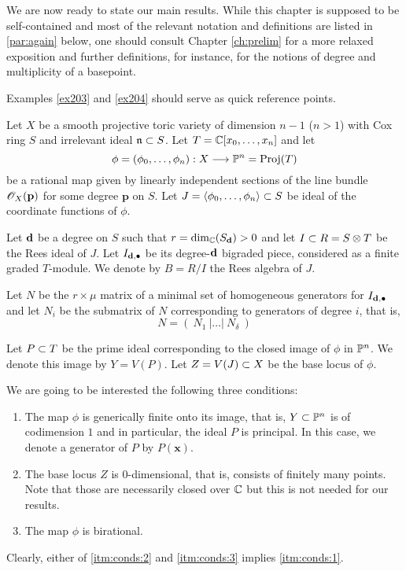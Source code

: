 \documentclass[fleqn,reqno]{amsart}
\newcounter{chapter}
\numberwithin{first}{chapter}
\begin{document}



\begin{paragraf*}
We are now ready to state our main results.
While this chapter is supposed to be self-contained and most of the relevant notation
and definitions are listed in \eqref{par:again} below,
one should consult Chapter \ref{ch:prelim} for a more relaxed exposition
and further definitions, for instance,
for the notions of degree and multiplicity of a basepoint.

Examples \ref{ex203} and \ref{ex204} should serve as quick reference points.
\end{paragraf*}

\begin{definition}
\label{par:again}
Let $X$ be a smooth projective toric variety of dimension $n-1$ ($n>1$)
with Cox ring $S$ and irrelevant ideal $\mathfrak{n}\subset S$.
Let $T=\mathbb{C}[x_0,\ldots,x_n]$ and let
\[
\phi=(\phi_0,\ldots,\phi_n):X\longrightarrow\mathbb{P}^n=\operatorname{Proj}(T)
\]
be a rational map given by linearly independent sections of the line bundle $\mathscr{O}_X(\mathbf p)$
for some degree $\mathbf p$ on $S$.
Let $J=\langle \phi_0,\ldots,\phi_n\rangle\subset S$ be ideal of the coordinate functions of $\phi$.

Let $\mathbf d$ be a degree on $S$ such that $r=\dim_{\mathbb{C}}(S_\mathbf d)>0$ and let $I\subset R=S\otimes T$ be the
Rees ideal of $J$. Let $I_{\mathbf d,\bullet}$ be its degree-$\mathbf d$ bigraded piece,
considered as a finite graded $T$-module.
We denote by $B=R/I$ the Rees algebra of $J$.

Let $N$ be the $r\times\mu$ matrix of a minimal set of homogeneous generators for $I_{\mathbf d,\bullet}$
and let $N_i$ be the submatrix of $N$ corresponding to generators of degree $i$, that is,
\[
N=(~N_1~|\ldots|~N_\delta~)
\]
\end{definition}

\begin{definition}
\label{par:conds}
Let $P\subset T$ be the prime ideal corresponding to the closed image of $\phi$ in $\mathbb{P}^n$.
We denote this image by $Y=V(P)$.
Let $Z=V(J)\subset X$ be the base locus of $\phi$.

We are going to be interested the following three conditions:
\begin{enumerate}
	\item\label{itm:conds:1} The map $\phi$ is generically finite onto its image, that is,
	$Y\subset\mathbb{P}^n$ is of codimension $1$ and in particular, the ideal $P$ is principal.
	In this case, we denote a generator of $P$ by $P(\mathbf x)$.
	\item\label{itm:conds:2} The base locus $Z$ is $0$-dimensional, that is,
	consists of finitely many points.
	Note that those are necessarily closed over $\mathbb{C}$ but this is not needed for our results.
	\item\label{itm:conds:3} The map $\phi$ is birational.
\end{enumerate}

Clearly, either of \eqref{itm:conds:2} and \eqref{itm:conds:3} implies \eqref{itm:conds:1}.
\end{definition}
\end{document}
